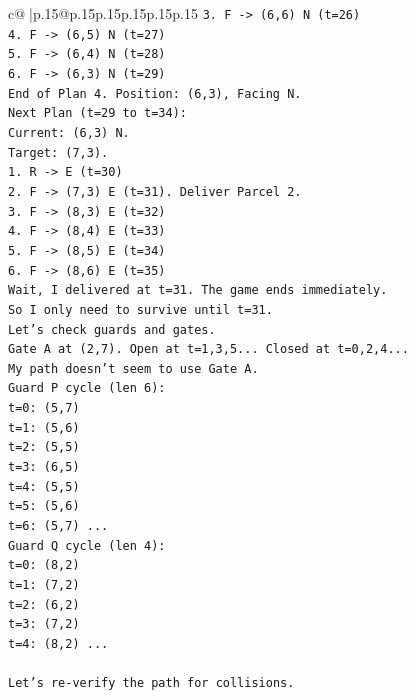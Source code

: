 \documentclass{article}
\begin{document}
{\begin{supertabular}{c@{$\;$}|p{.15\linewidth}@{}p{.15\linewidth}p{.15\linewidth}p{.15\linewidth}p{.15\linewidth}p{.15\linewidth}}
{{{\texttt{3. F {-}> (6,6) N (t=26)} \\
\texttt{4. F {-}> (6,5) N (t=27)} \\
\texttt{5. F {-}> (6,4) N (t=28)} \\
\texttt{6. F {-}> (6,3) N (t=29)} \\
\texttt{End of Plan 4. Position: (6,3), Facing N.} \\
\texttt{Next Plan (t=29 to t=34):} \\
\texttt{Current: (6,3) N.} \\
\texttt{Target: (7,3).} \\
\texttt{1. R {-}> E (t=30)} \\
\texttt{2. F {-}> (7,3) E (t=31). Deliver Parcel 2.} \\
\texttt{3. F {-}> (8,3) E (t=32)} \\
\texttt{4. F {-}> (8,4) E (t=33)} \\
\texttt{5. F {-}> (8,5) E (t=34)} \\
\texttt{6. F {-}> (8,6) E (t=35)} \\
\texttt{Wait, I delivered at t=31. The game ends immediately.} \\
\texttt{So I only need to survive until t=31.} \\
\texttt{Let's check guards and gates.} \\
\texttt{Gate A at (2,7). Open at t=1,3,5... Closed at t=0,2,4...} \\
\texttt{My path doesn't seem to use Gate A.} \\
\texttt{Guard P cycle (len 6):} \\
\texttt{t=0: (5,7)} \\
\texttt{t=1: (5,6)} \\
\texttt{t=2: (5,5)} \\
\texttt{t=3: (6,5)} \\
\texttt{t=4: (5,5)} \\
\texttt{t=5: (5,6)} \\
\texttt{t=6: (5,7) ...} \\
\texttt{Guard Q cycle (len 4):} \\
\texttt{t=0: (8,2)} \\
\texttt{t=1: (7,2)} \\
\texttt{t=2: (6,2)} \\
\texttt{t=3: (7,2)} \\
\texttt{t=4: (8,2) ...} \\
\\ 
\texttt{Let's re{-}verify the path for collisions.} \\
}}}
\end{supertabular}}
\end{document}

